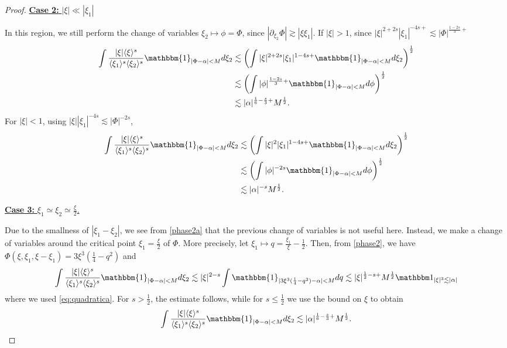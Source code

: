 \documentclass[%
11pt,  reqno]{amsart}
\newcommand{\fia}{\mathbbm{1}_{|\Phi-\alpha|<M}}
\newcommand{\jap}[1]{\langle #1 \rangle}
\newcommand{\5}{\textup{V}}
\newcommand{\noi}{\noindent}
\newcommand{\ind}{\mathbbm 1}
\newcommand{\les}{\lesssim}
\theoremstyle{remark}
\newcommand{\al}{\alpha}
\numberwithin{equation}{section}
\numberwithin{theorem}{section}
\begin{document}
\begin{proof}
\smallskip

\noi
\underline{ 
\textbf{Case 2:} $|\xi| \ll |\xi_1|$} 

In this region, we still perform the change of variables $\xi_2\mapsto \phi=\Phi$, since $|\partial_{\xi_2}\Phi|\gtrsim |\xi\xi_1|$. If $|\xi|>1$, since $|\xi|^{2+2s}|\xi_1|^{-4s+}\lesssim |\Phi|^{\frac{1-2s}{3}+} $
\begin{align*}
    \int \frac{|\xi|\jap{\xi}^s}{\jap{\xi_1}^s\jap{\xi_2}^s}\fia d\xi_2 &\lesssim \left(\int |\xi|^{2+2s}|\xi_1|^{1-4s+}\fia d\xi_2\right)^\frac12\\& \lesssim \left(\int |\phi|^{\frac{1-2s}{3}+}\fia d\phi\right)^\frac12\\&\lesssim |\alpha|^{\frac16 - \frac s3 +} M^{\frac12}.
\end{align*}
For $|\xi|<1$, using $|\xi||\xi_1|^{-4s}\lesssim |\Phi|^{-2s}$,
\begin{align*}
    \int \frac{|\xi|\jap{\xi}^s}{\jap{\xi_1}^s\jap{\xi_2}^s}\fia d\xi_2 &\lesssim \left(\int |\xi|^{2}|\xi_1|^{1-4s+}\fia d\xi_2\right)^\frac12\\& \lesssim \left(\int |\phi|^{-2s}\fia d\phi\right)^\frac12\\&\lesssim |\alpha|^{-s} M^{\frac12}.
\end{align*}



\smallskip

\noi
\underline{
\textbf{Case 3:} $\xi_1\simeq \xi_2 \simeq \frac{\xi}{2}$.} 

Due to the smallness of $|\xi_1-\xi_2|$, we see from \eqref{phase2a} that the previous change of variables is not useful here. Instead,
we make a change of variables around the critical point $\xi_1 = \frac\xi2$ of $\Phi$. More precisely, let $\xi_1 \mapsto q = \frac{\xi_1}{\xi} - \frac12$. Then, from \eqref{phase2}, we have $\Phi (\xi, \xi_1,\xi-\xi_1)=  3 \xi^3 (\frac14 - q^2)$ and 
\begin{align*}
\int \frac{|\xi|\jap{\xi}^s}{\jap{\xi_1}^s\jap{\xi_2}^s}\fia d\xi_2 \lesssim |\xi|^{2-s}\int \mathbbm{1}_{|3 \xi^3 (\frac14 - q^2)-\alpha|<M}dq \les |\xi|^{\frac12-s +} M^\frac12  \ind_{|\xi|^3 \les |\al|}
\end{align*}
where we used \eqref{eq:quadratica}. For $s> \frac12$, the estimate follows, while for $s\le\frac12$ we use the bound on $\xi$ to obtain
\begin{align}
\int \frac{|\xi|\jap{\xi}^s}{\jap{\xi_1}^s\jap{\xi_2}^s}\fia d\xi_2 \les |\alpha|^{\frac16-\frac s3+} M^\frac12. 
\end{align}



\end{proof}
\end{document}
